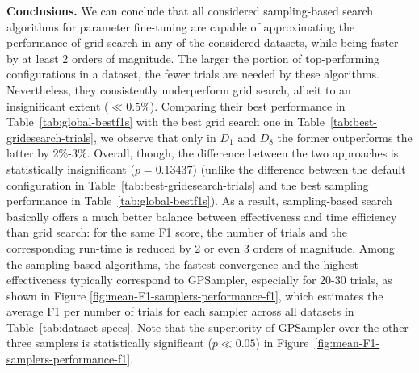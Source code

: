 \textbf{Conclusions.} We can conclude that all considered sampling-based search algorithms for parameter fine-tuning are capable of approximating the performance of grid search in any of the considered datasets, while being faster by at least 2 orders of magnitude.
The larger the portion of top-performing configurations in a dataset, the fewer trials are needed by these algorithms. Nevertheless, they consistently underperform grid search, albeit to an insignificant extent ($\ll0.5\%$).
Comparing their best performance in Table~\ref{tab:global-bestf1s} with the best grid search one in Table~\ref{tab:best-gridesearch-trials}, we observe that only in $D_1$ and $D_8$ the former outperforms the latter by 2\%-3\%. {Overall, though, the difference between the two approaches is statistically insignificant ($p=0.13437$) (unlike the difference between the default configuration in Table~\ref{tab:best-gridesearch-trials} and the best sampling performance in Table~\ref{tab:global-bestf1s}).}
As a result, sampling-based search basically 
offers a much better balance between effectiveness and time efficiency than grid search: for the same F1 score, the number of trials and the corresponding run-time is reduced by 2 or even 3 orders of magnitude. Among the sampling-based algorithms, the fastest convergence and the highest effectiveness typically correspond to GPSampler, especially for 20-30 trials, as shown in Figure \ref{fig:mean-F1-samplers-performance-f1}, which estimates the average F1 per number of trials for each sampler across all datasets in Table~\ref{tab:dataset-specs}. {Note that the superiority of GPSampler over the other three samplers is statistically significant ($p\ll0.05$) in Figure~\ref{fig:mean-F1-samplers-performance-f1}}.

